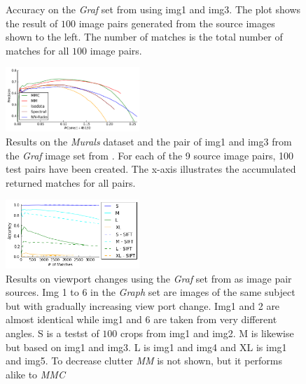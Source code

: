 \documentclass[12pt,journal]{IEEEtran}
\begin{document}
\begin{figure}
{\begin{subfigure}[t]{.27\textwidth}
		\end{subfigure}%
	}%
	\caption{Accuracy on the \emph{Graf} set from 
		\cite{mikolajczyk2005performance} using img1 and img3. The plot 
		shows the result of $100$ image pairs generated from the source 
		images shown to the left. The number of matches is the total 
		number of matches for all $100$ image pairs.}
	\label{fig:result_graf}
\end{figure}

\begin{figure}
	\centering
	\includegraphics[width=0.45\textwidth]{images/result_accumulated}
	\caption{Results on the \emph{Murals} dataset and the pair of img1 
		and img3 from the \emph{Graf} image set from 	
		\cite{mikolajczyk2005performance}. For each of the 9 source 
		image pairs, 100 test pairs have been created.  The x-axis 
	illustrates the accumulated returned matches for all pairs.}
	\label{fig:result_accumulated}
\end{figure}

\begin{figure}
	\centering
	\includegraphics[width=0.45\textwidth]{images/result_viewport}
	\caption{Results on viewport changes using the \emph{Graf} set from 
		\cite{mikolajczyk2005performance} as image pair sources. Img 1 
		to 6 in the \emph{Graph} set are images of the same subject but 
		with gradually increasing view port change. Img1 and 2 are 
		almost identical while img1 and 6 are taken from very different 
		angles. S is a testst of $100$ crops from img1 and img2. M is 
	likewise but based on img1 and img3.  L is img1 and img4 and XL is 
img1 and img5.  To decrease clutter \emph{MM} is not shown, but it 
performs alike to \emph{MMC}}
	\label{fig:result_viewport}
\end{figure}
\end{document}
